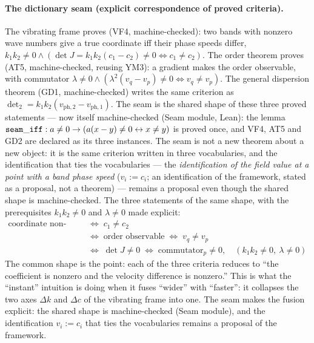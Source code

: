 \documentclass[aps,prd,preprint,superscriptaddress,amsmath,amssymb]{revtex4-2}
\begin{document}
\paragraph{The dictionary seam (explicit correspondence of proved
criteria).}
The vibrating frame proves (VF4, machine-checked): two bands with
nonzero wave numbers give a true coordinate iff their phase speeds
differ, $k_1k_2\ne0 \wedge (\det J=k_1k_2(c_1-c_2)\ne0
\Leftrightarrow c_1\ne c_2)$.  The order theorem proves (AT5,
machine-checked, reusing YM3): a gradient makes the order observable,
with commutator $\lambda\ne0 \wedge (\lambda^2(v_q-v_p)\ne0
\Leftrightarrow v_q\ne v_p)$.  The general dispersion theorem (GD1,
machine-checked) writes the same criterion as
$\det_2=k_1k_2(v_{{\mathrm{ph}},2}-v_{{\mathrm{ph}},1})$.  The
seam is the shared shape of these three proved statements --- now
itself machine-checked (Seam module, Lean): the lemma
${\tt seam\_iff}: a\ne0 \rightarrow (a(x-y)\ne0 \leftrightarrow
x\ne y)$ is proved once, and VF4, AT5 and GD2 are declared as its
three instances.  The seam is not a new theorem about a new object:
it is the same criterion written in three vocabularies, and the
identification that ties the vocabularies --- the \emph{identification of the field value at a point with a band phase
speed} ($v_i:=c_i$; an identification of the framework, stated as a
proposal, not a theorem) --- remains a proposal even though the
shared shape is machine-checked.  The three statements of the same
shape, with the prerequisites $k_1k_2\ne0$ and $\lambda\ne0$ made
explicit:
\begin{equation}
\begin{aligned}
\text{coordinate non-degenerate} &\;\Leftrightarrow\; c_1\ne c_2 \\
&\;\Leftrightarrow\; \text{order observable} \;\Leftrightarrow\; v_q\ne v_p \\
&\;\Leftrightarrow\; \det J\ne0 \;\Leftrightarrow\; \text{commutator}_p \ne0 ,
\quad (k_1k_2\ne0,\ \lambda\ne0)
\end{aligned}
\label{eq:seam}
\end{equation}
The common shape is the point: each of the three criteria
reduces to ``the coefficient is nonzero and the velocity difference
is nonzero.''  This is what the ``instant'' intuition is doing when
it fuses ``wider'' with ``faster'': it collapses the two axes
$\Delta k$ and $\Delta c$ of the vibrating frame into one.  The
seam makes the fusion explicit: the shared shape is machine-checked
(Seam module), and the identification $v_i:=c_i$ that ties the
vocabularies remains a proposal of the framework.
\end{document}
